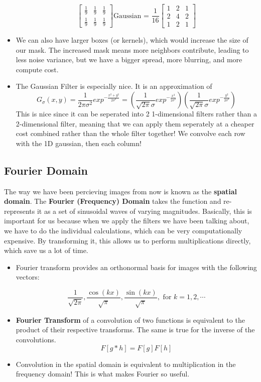 \documentclass{article}
\begin{document}
\begin{itemize}
$$\begin{bmatrix}
\frac{1}{9} & \frac{1}{9} & \frac{1}{9}\\
\frac{1}{9} & \frac{1}{9} & \frac{1}{9}
\end{bmatrix}
\text{Gaussian = }\frac{1}{16}
\begin{bmatrix}
1 & 2 & 1\\
2 & 4 & 2\\
1 & 2 & 1
\end{bmatrix}
$$
\item We can also have larger boxes (or kernels), which would increase the size of our mask. The increased mask means more neighbors contribute, leading to less noise variance, but we have a bigger spread, more blurring, and more compute cost.
\item The Gaussian Filter is especially nice. It is an approximation of 
$$G_\sigma(x,y) = \frac{1}{2\pi\sigma^2}exp^{-\frac{x^2 + y^2}{2\sigma^2}} = (\frac{1}{\sqrt{2\pi}\sigma}exp^{-\frac{x^2}{2\sigma^2}})(\frac{1}{\sqrt{2\pi}\sigma}exp^{-\frac{y^2}{2\sigma^2}})$$
This is nice since it can be seperated into 2 1-dimensional filters rather than a 2-dimensional filter, meaning that we can apply them seperately at a cheaper cost combined rather than the whole filter together! We convolve each row with the 1D gaussian, then each column!
\end{itemize}
\subsection{Fourier Domain}
The way we have been percieving images from now is known as the \textbf{spatial domain}. The \textbf{Fourier (Frequency) Domain} takes the function and re-represents it as a set of sinusoidal waves of varying magnitudes. Basically, this is important for us because when we apply the filters we have been talking about, we have to do the individual calculations, which can be very computationally expensive. By transforming it, this allows us to perform multiplications directly, which save us a lot of time. 
\begin{itemize}
    \item Fourier transform provides an orthonormal basis for images with the following vectors:
    
$$\frac{1}{\sqrt{2\pi}},\frac{\cos(kx)}{\sqrt{\pi}},\frac{\sin(kx)}{\sqrt{\pi}}, \text{  for  } k = 1,2,\cdots$$

    \item \textbf{Fourier Transform} of a convolution of two functions is equivalent to the product of their respective transforms. The same is true for the inverse of the convolutions. 
    $$F[g*h] = F[g]F[h]$$
    \item Convolution in the spatial domain is equivalent to multiplication in the frequency domain! This is what makes Fourier so useful.
\end{itemize}
\end{document}
